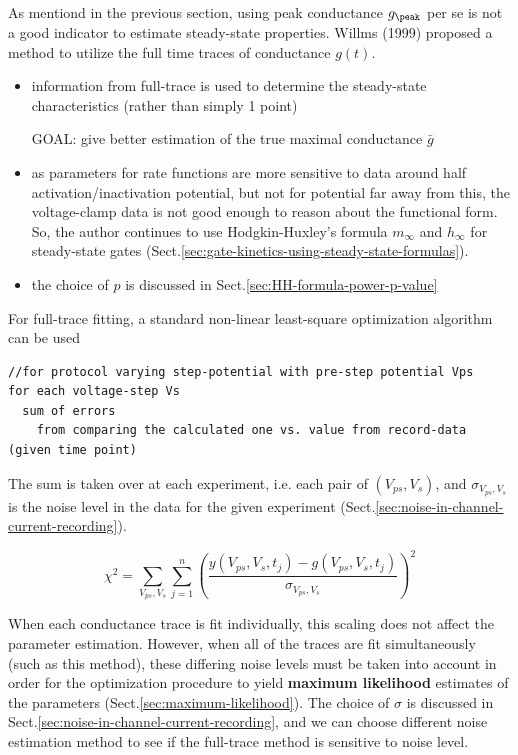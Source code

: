 As mentiond in the previous section, using peak conductance $g_\peak$ per se is
not a good indicator to estimate steady-state properties. Willms (1999) proposed
a method to utilize the full time traces of conductance $g(t)$.
\begin{itemize}
  \item information from full-trace is used to determine the steady-state
  characteristics (rather than simply 1 point)

GOAL: give better estimation of the true maximal conductance $\bar{g}$

  \item as parameters for rate functions are more sensitive to data around half
  activation/inactivation potential, but not for potential far away from this,
  the voltage-clamp data is not good enough to reason about the functional form.
  So, the author continues to use Hodgkin-Huxley's formula $m_\infty$ and
  $h_\infty$ for steady-state gates
  (Sect.\ref{sec:gate-kinetics-using-steady-state-formulas}).

  \item the choice of $p$ is discussed in Sect.\ref{sec:HH-formula-power-p-value}
\end{itemize}

For full-trace fitting, a standard non-linear least-square optimization
algorithm can be used
\begin{verbatim}
//for protocol varying step-potential with pre-step potential Vps
for each voltage-step Vs
  sum of errors
	from comparing the calculated one vs. value from record-data (given time point)
\end{verbatim}

The sum is taken over at each experiment, i.e. each pair of $(V_{ps}, V_s)$, and
$\sigma_{V_{ps},V_s}$ is the noise level in the data for the given experiment
(Sect.\ref{sec:noise-in-channel-current-recording}).

\begin{equation}
\chi^2  = \sum_{V_{ps}, V_s} \sum_{j=1}^n
  \left( \frac{y(V_{ps}, V_s, t_j) - g(V_{ps}, V_s, t_j)}{\sigma_{V_{ps}, V_s}}
  \right)^2
\end{equation}

When each conductance trace is fit individually, this scaling does not affect
the parameter estimation. However, when all of the traces are fit simultaneously
(such as this method), these differing noise levels must be taken into account
in order for the optimization procedure to yield {\bf maximum likelihood}
estimates of the parameters (Sect.\ref{sec:maximum-likelihood}). The choice of
$\sigma$ is discussed in Sect.\ref{sec:noise-in-channel-current-recording}, and
we can choose different noise estimation method to see if the full-trace method
is sensitive to noise level.

